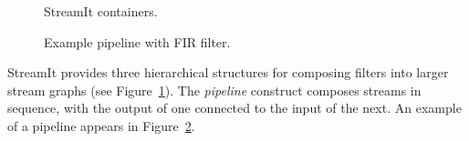 \begin{figure}[t]
\begin{center}
\vspace{-24pt}
 \vspace{-6pt}
 \caption{StreamIt containers.}
 \label{fig:containers}
\end{center}
\end{figure}

\begin{figure}[t]
\begin{center}
\vspace{-12pt}
 \vspace{-6pt}
 \caption{Example pipeline with FIR filter.}
 \label{fig:pipeline}
\vspace{-18pt}
\end{center}
\end{figure}

StreamIt provides three hierarchical structures for composing filters
into larger stream graphs (see Figure~\ref{fig:containers}). The 
{\it pipeline} construct composes streams in sequence, with the output
of one connected to the input of the next.   An example of a pipeline
appears in Figure~\ref{fig:pipeline}.

